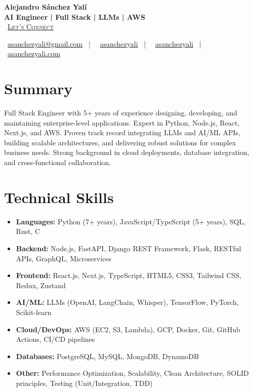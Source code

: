 \documentclass[letterpaper,11pt]{article}
\newcommand{\normalfaCalendar}{{\mdseries\faCalendar}}
\newcommand{\normalfaEnvelope}{{\mdseries\faEnvelope}}
\newcommand{\normalfaLinkedin}{{\mdseries\faLinkedin}}
\newcommand{\normalfaGithub}{{\mdseries\faGithub}}
\newcommand{\normalfaGlobe}{{\mdseries\faGlobe}}
\begin{document}
\begin{center}
\textbf{\Huge Alejandro Sánchez Yalí}\\[0.3em]
\textbf{\Large AI Engineer | Full Stack | LLMs | AWS}\\[0.5em]
\small
\normalfaCalendar\ \href{https://cal.com/asanchezyali/full-time-opportunities}{\textsc{Let's Connect}}

\vspace{1em}
\normalfaEnvelope\ \href{mailto:asanchezyali@gmail.com}{asanchezyali@gmail.com}  ~|~
\normalfaLinkedin\ \href{https://www.linkedin.com/in/asanchezyali}{asanchezyali} ~|~
\normalfaGithub\ \href{https://github.com/asanchezyali}{asanchezyali}  ~|~
\normalfaGlobe\ \href{https://asanchezyali.com}{asanchezyali.com}
\end{center}

\section{Summary}
Full Stack Engineer with 5+ years of experience designing, developing, and maintaining enterprise-level applications. Expert in Python, Node.js, React, Next.js, and AWS. Proven track record integrating LLMs and AI/ML APIs, building scalable architectures, and delivering robust solutions for complex business needs. Strong background in cloud deployments, database integration, and cross-functional collaboration.

\section{Technical Skills}
\begin{itemize}[leftmargin=*]
  \item \textbf{Languages:} Python (7+ years), JavaScript/TypeScript (5+ years), SQL, Rust, C
  \item \textbf{Backend:} Node.js, FastAPI, Django REST Framework, Flask, RESTful APIs, GraphQL, Microservices
  \item \textbf{Frontend:} React.js, Next.js, TypeScript, HTML5, CSS3, Tailwind CSS, Redux, Zustand
  \item \textbf{AI/ML:} LLMs (OpenAI, LangChain, Whisper), TensorFlow, PyTorch, Scikit-learn
  \item \textbf{Cloud/DevOps:} AWS (EC2, S3, Lambda), GCP, Docker, Git, GitHub Actions, CI/CD pipelines
  \item \textbf{Databases:} PostgreSQL, MySQL, MongoDB, DynamoDB
  \item \textbf{Other:} Performance Optimization, Scalability, Clean Architecture, SOLID principles, Testing (Unit/Integration, TDD)
\end{itemize}
\end{document}
